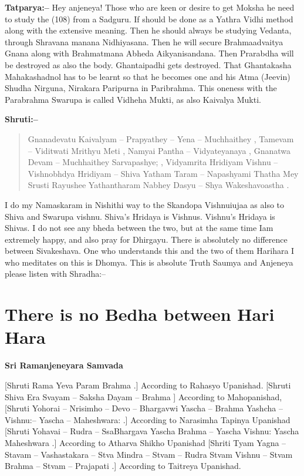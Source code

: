 \textbf{Tatparya:–} Hey anjeneya! Those who are keen or desire to get Moksha he need to study the (108) from a Sadguru. If should be done as a Yathra Vidhi method along with the extensive meaning. Then he should always be studying Vedanta, through Shravana manana Nidhiyasana. Then he will secure Brahmaadvaitya Gnana along with Brahmatmana Abheda Aikyanisandana. Then Prarabdha will be destroyed as also the body. Ghantaipadhi gets destroyed. That Ghantakasha Mahakashadnol has to be learnt so that he becomes one and his Atma (Jeevin) Shudha Nirguna, Nirakara Paripurna in Paribrahma. This oneness with the Parabrahma Swarupa is called Vidheha Mukti, as also Kaivalya Mukti.

\textbf{Shruti:–}

\begin{verse}
Gnanadevatu Kaivalyam – Prapyathey – Yena – Muchhaithey , Tamevam – Viditwati Mrithyu Meti , Namyai Pantha – Vidyateyanaya , Gnanatwa Devam – Muchhaithey Sarvapashye; , Vidyamrita Hridiyam Vishnu – Vishnobhdya Hridiyam – Shiva Yatham Taram – Napashyami Thatha Mey Srusti Rayushee  Yathantharam Nabhey Dasyu – Shya Wakeshavoastha .
\end{verse}

I do my Namaskaram in Nishithi way to the Skandopa Vishnuiujaa as also to Shiva and Swarupa vishnu. Shiva's Hridaya is Vishnus. Vishnu's Hridaya is Shivas. I do not see any bheda between the two, but at the same time Iam extremely happy, and also pray for Dhirgayu. There is absolutely no difference between Sivakeshava. One who understands this and the two of them Harihara I who meditates on this is Dhomya. This is absolute Truth Saumya and Anjeneya please listen with Shradha:–

\chapter{There is no Bedha between Hari Hara}

\begin{center}
\textbf{Sri Ramanjeneyara Samvada}
\end{center}

[Shruti  Rama Yeva Param Brahma .] According to Rahasyo Upanishad. [Shruti  Shiva Era Svayam – Saksha Dayam – Brahma ] According to Mahopanishad, [Shruti  Yohorai – Nrisimho – Devo – Bhargavwi  Yascha – Brahma Yashcha – Vishnu:– Yascha – Maheshwara: .] According to Narasimha Tapinya Upanishad [Shruti  Yohavai – Rudra – SsaBhargava  Yascha Brahma – Yascha Vishnu: Yascha Maheshwara .] According to Atharva Shikho Upanishad [Shriti  Tyam Yagna – Stavam – Vashastakara – Stva Mindra – Stvam – Rudra Stvam Vishnu – Stvam Brahma – Stvam – Prajapati .] According to Taitreya Upanishad.

